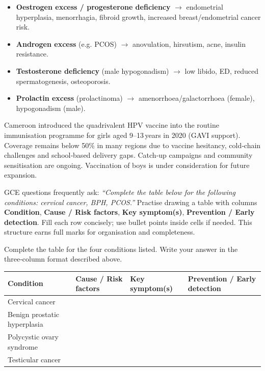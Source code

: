 \documentclass[11pt]{article}
\begin{document}
\begin{propriete}
\begin{itemize}
  \item \textbf{Oestrogen excess / progesterone deficiency} $\rightarrow$ endometrial hyperplasia, menorrhagia, fibroid growth, increased breast/endometrial cancer risk.
  \item \textbf{Androgen excess} (e.g. PCOS) $\rightarrow$ anovulation, hirsutism, acne, insulin resistance.
  \item \textbf{Testosterone deficiency} (male hypogonadism) $\rightarrow$ low libido, ED, reduced spermatogenesis, osteoporosis.
  \item \textbf{Prolactin excess} (prolactinoma) $\rightarrow$ amenorrhoea/galactorrhoea (female), hypogonadism (male).
\end{itemize}
\end{propriete}

\begin{savaistu}
Cameroon introduced the quadrivalent HPV vaccine into the routine immunisation programme for girls aged 9–13 years in 2020 (GAVI support). Coverage remains below 50\% in many regions due to vaccine hesitancy, cold‑chain challenges and school‑based delivery gaps. Catch‑up campaigns and community sensitisation are ongoing. Vaccination of boys is under consideration for future expansion.
\end{savaistu}

\begin{aretenir}
GCE questions frequently ask: \emph{“Complete the table below for the following conditions: cervical cancer, BPH, PCOS.”} Practise drawing a table with columns \textbf{Condition}, \textbf{Cause / Risk factors}, \textbf{Key symptom(s)}, \textbf{Prevention / Early detection}. Fill each row concisely; use bullet points inside cells if needed. This structure earns full marks for organisation and completeness.
\end{aretenir}

\begin{exercice}
Complete the table for the four conditions listed. Write your answer in the three‑column format described above.

\begin{center}
\begin{tabularx}{\linewidth}{|l|X|X|X|}
\hline
\rowcolor{popblueL}
\textbf{Condition} & \textbf{Cause / Risk factors} & \textbf{Key symptom(s)} & \textbf{Prevention / Early detection} \\
\hline
Cervical cancer & & & \\
\hline
Benign prostatic hyperplasia & & & \\
\hline
Polycystic ovary syndrome & & & \\
\hline
Testicular cancer & & & \\
\hline
\end{tabularx}
\end{center}
\end{exercice}
\end{document}
